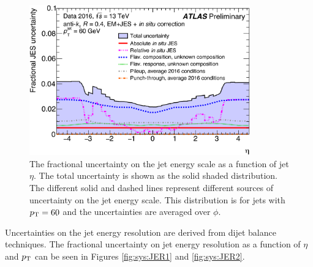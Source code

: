\begin{figure}[!h]
\begin{center}
\includegraphics[width=0.85\textwidth]{figures/JetCalib/JES_eta.png}
\caption[The fractional uncertainty on the jet energy scale vs jet $\eta$. ]{The fractional uncertainty on the jet energy scale as a function of jet $\eta$.  The total uncertainty is shown as the solid shaded distribution.  The different solid and dashed lines represent different sources of uncertainty on the jet energy scale. This distribution is for jets with $p_{\mathrm{T}} = 60$ \gev and the uncertainties are averaged over $\phi$.}
\label{fig:sys:JES2}
\end{center}
\end{figure}

\indent Uncertainties on the jet energy resolution are derived from dijet balance techniques.\cite{JES_dijet}  The fractional uncertainty on jet energy resolution as a function of $\eta$ and $p_{\mathrm{T}}$ can be seen in Figures \ref{fig:sys:JER1} and \ref{fig:sys:JER2}. \\

